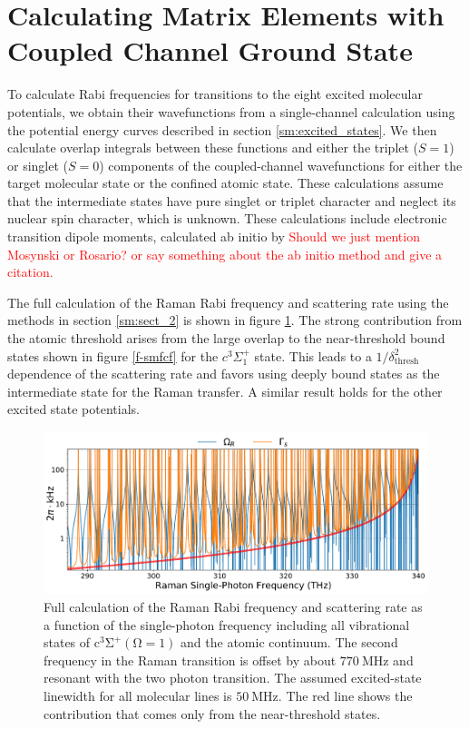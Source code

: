 \documentclass[aps,secnumarabic,amsmath,amssymb,10pt,superscriptaddress]{revtex4}
\begin{document}
\section{Calculating Matrix Elements with Coupled Channel Ground State}
To calculate Rabi frequencies for transitions to the eight excited molecular potentials, we
obtain their wavefunctions from a single-channel calculation \cite{Fattal1996} using the potential energy curves described in section \ref{sm:excited_states}. We
then calculate overlap integrals between these functions and either the triplet ($S=1$) or singlet ($S=0$) components of the
coupled-channel wavefunctions for either the target molecular state or the confined atomic state.
These calculations assume that the intermediate states have pure singlet or triplet character and neglect its
nuclear spin character, which is unknown. These calculations include electronic transition dipole moments, calculated ab initio by \textcolor{red}{Should we just mention Mosynski or Rosario? or say something about the ab initio method and give a citation.}

The full calculation of the Raman Rabi frequency and scattering rate using the methods in section \ref{sm:sect_2} is shown in figure \ref{f-sm}. The strong contribution from the atomic threshold arises from the large overlap to the near-threshold bound states shown in figure \ref{f-smfcf} for the $c^3\Sigma^+_1$ state. This leads to a $1/\delta_{\text{thresh}}^2$ dependence of the scattering rate and favors using deeply bound states as the intermediate state for the Raman transfer. A similar result holds for the other excited state potentials.



\begin{figure}[ht!]
  \includegraphics[width=\textwidth]{imgs/raman_theory_full.pdf}
  \caption{Full calculation of the Raman Rabi frequency and scattering rate
    as a function of the single-photon frequency
    including all vibrational states of $ \mathrm{c^3\Sigma^+(\Omega = 1)}$
    and the atomic continuum.
    The second frequency in the Raman transition is offset by about $770~\mathrm{MHz}$
    and resonant with the two photon transition.
    The assumed excited-state linewidth for all molecular lines is $50~\text{MHz}$.
    The red line shows the contribution that comes only from the near-threshold states.
    \label{f-sm}}
\end{figure}
\end{document}
